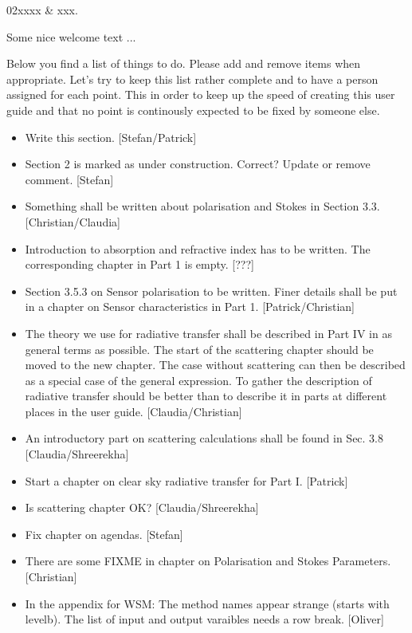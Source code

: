 %
%
 \label{sec:intro}

%
%
\starthistory
  02xxxx & xxx.\\
\stophistory


Some nice welcome text ...


Below you find a list of things to do. Please add and remove items
when appropriate. Let's try to keep this list rather complete and to
have a person assigned for each point. This in order to keep up the
speed of creating this user guide and that no point is continously
expected to be fixed by someone else.
\begin{itemize}
\item Write this section. [Stefan/Patrick]
\item Section 2 is marked as under construction. Correct? Update or
  remove comment. [Stefan]
\item Something shall be written about polarisation and Stokes in Section
   3.3. [Christian/Claudia]
\item Introduction to absorption and refractive index has to be written.
  The corresponding chapter in Part 1 is empty.
  [???]
\item Section 3.5.3 on Sensor polarisation to be written. Finer details
  shall be put in a chapter on Sensor characteristics in Part 1. 
  [Patrick/Christian]
\item The theory we use for radiative transfer shall be described in Part
  IV in as general terms as possible. The start of the scattering chapter
  should be moved to the new chapter. The case without scattering can then
  be described as a special case of the general expression. To gather the
  description of radiative transfer should be better than to describe it 
  in parts at different places in the user guide. [Claudia/Christian]
\item An introductory part on scattering calculations shall be found
   in Sec. 3.8 [Claudia/Shreerekha]
\item Start a chapter on clear sky radiative transfer for Part I. [Patrick]
\item Is scattering chapter OK? [Claudia/Shreerekha]
\item Fix chapter on agendas. [Stefan]
\item There are some FIXME in chapter on Polarisation and Stokes Parameters.
  [Christian]
\item In the appendix for WSM: The method names appear strange (starts
  with levelb). The list of input and output varaibles needs a row break.
  [Oliver]
\end{itemize}




